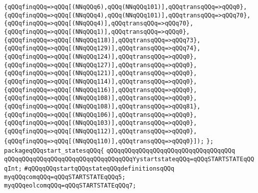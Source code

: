\verb|{qQQqfinqQQq=>qQQq[(NNqQQq6),qQQq(NNqQQq101)],qQQqtransqQQq=>qQQq0},|\newline
\verb|{qQQqfinqQQq=>qQQq[(NNqQQq4),qQQq(NNqQQq101)],qQQqtransqQQq=>qQQq70},|\newline
\verb|{qQQqfinqQQq=>qQQq[(NNqQQq4)],qQQqtransqQQq=>qQQq70},|\newline
\verb|{qQQqfinqQQq=>qQQq[(NNqQQq1)],qQQqtransqQQq=>qQQq0},|\newline
\verb|{qQQqfinqQQq=>qQQq[(NNqQQq118)],qQQqtransqQQq=>qQQq73},|\newline
\verb|{qQQqfinqQQq=>qQQq[(NNqQQq129)],qQQqtransqQQq=>qQQq74},|\newline
\verb|{qQQqfinqQQq=>qQQq[(NNqQQq124)],qQQqtransqQQq=>qQQq0},|\newline
\verb|{qQQqfinqQQq=>qQQq[(NNqQQq127)],qQQqtransqQQq=>qQQq0},|\newline
\verb|{qQQqfinqQQq=>qQQq[(NNqQQq121)],qQQqtransqQQq=>qQQq0},|\newline
\verb|{qQQqfinqQQq=>qQQq[(NNqQQq114)],qQQqtransqQQq=>qQQq0},|\newline
\verb|{qQQqfinqQQq=>qQQq[(NNqQQq116)],qQQqtransqQQq=>qQQq0},|\newline
\verb|{qQQqfinqQQq=>qQQq[(NNqQQq108)],qQQqtransqQQq=>qQQq0},|\newline
\verb|{qQQqfinqQQq=>qQQq[(NNqQQq108)],qQQqtransqQQq=>qQQq81},|\newline
\verb|{qQQqfinqQQq=>qQQq[(NNqQQq106)],qQQqtransqQQq=>qQQq0},|\newline
\verb|{qQQqfinqQQq=>qQQq[(NNqQQq103)],qQQqtransqQQq=>qQQq0},|\newline
\verb|{qQQqfinqQQq=>qQQq[(NNqQQq112)],qQQqtransqQQq=>qQQq0},|\newline
\verb|{qQQqfinqQQq=>qQQq[(NNqQQq110)],qQQqtransqQQq=>qQQq0}]);|\newline
\verb|};|\newline
\verb|packageqQQqstart_statesqQQq{|\newline
\verb|qQQqqQQqqQQqqQQqqQQqqQQqqQQqqQQqqQQq|\newline
\verb|qQQqqQQqqQQqqQQqqQQqqQQqqQQqqQQqqQQqYystartstateqQQq=qQQqSTARTSTATEqQQqInt;|\newline
\newline
\verb|#qQQqqQQqstartqQQqstateqQQqdefinitionsqQQq|\newline
\newline
\verb|myqQQqcomqQQq=qQQqSTARTSTATEqQQq5;|\newline
\verb|myqQQqeolcomqQQq=qQQqSTARTSTATEqQQq7;|\newline

